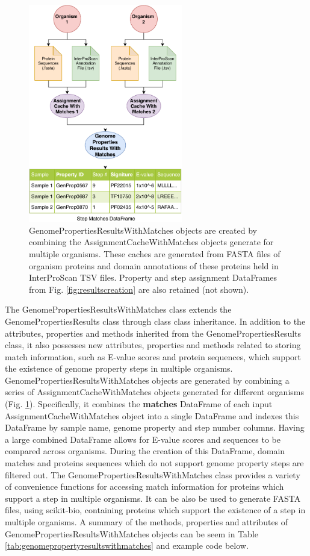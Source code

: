 \begin{figure}[!ht]
  \centering
	\includegraphics[width=0.60\textwidth]{media/assignment_results_with_matches_overview.pdf}
	 \caption{GenomePropertiesResultsWithMatches objects are created by combining the AssignmentCacheWithMatches objects generate for multiple organisms. These caches are generated from FASTA files of organism proteins and domain annotations of these proteins held in InterProScan TSV files. Property and step assignment DataFrames from  Fig. \ref{fig:resultscreation} are also retained (not shown).}
	 \label{fig:resultswithmatchescreation}
\end{figure}

The GenomePropertiesResultsWithMatches class extends the GenomePropertiesResults class through class class inheritance. In addition to the attributes, properties and methods inherited from the GenomePropertiesResults class, it also possesses new attributes, properties and methods related to storing match information, such as E-value scores and protein sequences, which support the existence of genome property steps in multiple organisms. GenomePropertiesResultsWithMatches objects are generated by combining a series of AssignmentCacheWithMatches objects generated for different organisms (Fig. \ref{fig:resultswithmatchescreation}). Specifically, it combines the \textbf{matches} DataFrame of each input AssignmentCacheWithMatches object into a single DataFrame and indexes this DataFrame by sample name, genome property and step number columns. Having a large combined DataFrame allows for E-value scores and sequences to be compared across organisms. During the creation of this DataFrame, domain matches and proteins sequences which do not support genome property steps are filtered out. The GenomePropertiesResultsWithMatches class provides a variety of convenience functions for accessing match information for proteins which support a step in multiple organisms. It can be also be used to generate FASTA files, using scikit-bio, containing proteins which support the existence of a step in multiple organisms. A summary of the methods, properties and attributes of GenomePropertiesResultsWithMatches objects can be seem in Table \ref{tab:genomepropertyresultswithmatches} and example code below. 

